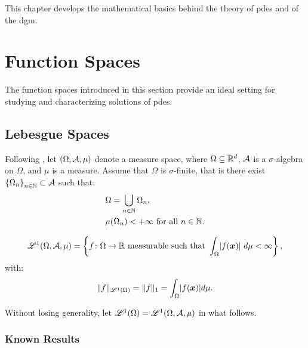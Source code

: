 This chapter develops the mathematical basics behind the theory of \acrlong{pdes} and of the \acrlong{dgm}.

\section{Function Spaces}

The function spaces introduced in this section provide an ideal setting for studying and characterizing solutions of \acrshort{pdes}.

\subsection{Lebesgue Spaces}

Following \cite[p. 89]{Brezis2010}, let $(\Omega, \mathcal{A}, \mu)$ denote a measure space, where $\Omega \subseteq \mathbb{R}^{d}$, $\mathcal{A}$ is a $\sigma$-algebra on $\Omega$, and $\mu$ is a measure. Assume that $\Omega$ is $\sigma$-finite, that is there exist $\left\{ \Omega_n \right\}_{n \in \mathbb{N}} \subset \mathcal{A}$ such that:
\begin{align}
    & \Omega = \bigcup_{n \in \mathbb{N}} \Omega_n, \\
    & \mu(\Omega_n) < +\infty \text{ for all } n \in \mathbb{N}.
\end{align}

\begin{definition}
    \begin{gather}
        \mathscr{L}^{1}(\Omega, \mathcal{A}, \mu) = \left\{ f \colon \Omega \rightarrow \mathbb{R} \text{ measurable such that } \int_{\Omega} \lvert f(\bm{x}) \rvert ~ d \mu < \infty \right\},
    \end{gather}
    with:
    \begin{gather}
    \lVert f \rVert_{\mathscr{L}^{1}(\Omega)} = \lVert f \rVert_{1} = \int_{\Omega} \lvert f(\bm{x}) \rvert d \mu.
    \end{gather}
\end{definition}

Without losing generality, let $\mathscr{L}^{1}(\Omega) = \mathscr{L}^{1}(\Omega, \mathcal{A}, \mu)$ in what follows.

\subsubsection{Known Results}

